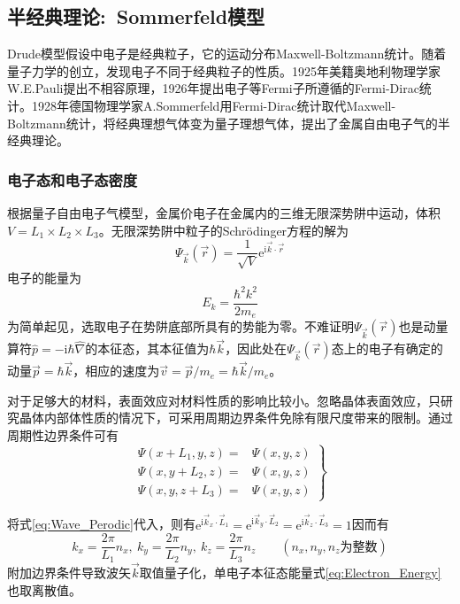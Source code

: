 \subsection{半经典理论:~Sommerfeld模型} 
Drude模型假设中电子是经典粒子，它的运动分布Maxwell-Boltzmann统计。随着量子力学的创立，发现电子不同于经典粒子的性质。1925年美籍奥地利物理学家W.E.Pauli提出不相容原理，1926年提出电子等Fermi子所遵循的Fermi-Dirac统计。1928年德国物理学家A.Sommerfeld用Fermi-Dirac统计取代Maxwell-Boltzmann统计，将经典理想气体变为量子理想气体，提出了金属自由电子气的半经典理论。

\subsubsection{电子态和电子态密度} 
根据量子自由电子气模型，金属价电子在金属内的三维无限深势阱中运动，体积$V=L_1\times L_2\times L_3$。无限深势阱中粒子的Schr\"odinger方程的解为
\begin{equation}
	\Psi_{\vec k}(\vec r)=\dfrac1{\sqrt V}\mathrm{e}^{\mathrm{i}\vec k\cdot\vec r}
	\label{eq:Schrodinger-3D}
\end{equation} 
电子的能量为 
\begin{equation}
	E_k=\dfrac{\hbar^2k^2}{2m_e}
	\label{eq:Electron_Energy}
\end{equation}
为简单起见，选取电子在势阱底部所具有的势能为零。不难证明$\Psi_{\vec k}(\vec r)$也是动量算符$\hat p=-\mathrm{i}\hbar\hat{\nabla}$的本征态，其本征值为$\hbar\vec k$，因此处在$\Psi_{\vec k}(\vec r)$态上的电子有确定的动量$\vec p=\hbar\vec k$，相应的速度为$\vec v=\vec p/m_e=\hbar\vec k/m_e$。

对于足够大的材料，表面效应对材料性质的影响比较小。忽略晶体表面效应，只研究晶体内部体性质的情况下，可采用周期边界条件免除有限尺度带来的限制。通过周期性边界条件可有
\begin{equation}
	\left.\begin{aligned}
	\Psi(x+L_1,y,z)=&\Psi(x,y,z)	\\
	\Psi(x,y+L_2,z)=&\Psi(x,y,z)	\\
	\Psi(x,y,z+L_3)=&\Psi(x,y,z)
\end{aligned}\right\}
	\label{eq:Wave_Perodic}
\end{equation}

将式\eqref{eq:Wave_Perodic}代入，则有$\mathrm{e}^{\mathrm{i}\vec k_x\cdot\vec L_1}=\mathrm{e}^{\mathrm{i}\vec k_y\cdot\vec L_2}=\mathrm{e}^{\mathrm{i}\vec k_z\cdot\vec L_3}=1$因而有
\begin{equation}
	k_x=\dfrac{2\pi}{L_1}n_x,~k_y=\dfrac{2\pi}{L_2}n_y,~k_z=\dfrac{2\pi}{L_3}n_z \qquad (n_x,n_y,n_z\mbox{为整数})
	\label{eq:Perodic_Condition}
\end{equation}
附加边界条件导致波矢$\vec k$取值量子化，单电子本征态能量式\eqref{eq:Electron_Energy}也取离散值。

